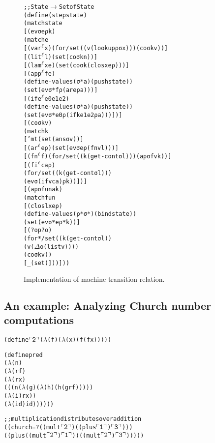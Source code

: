 \documentclass[preprint]{sigplanconf}
\begin{document}
\begin{figure}
\begin{alltt}
  ;; State \(\rightarrow\) Setof State
  (define (step state)
    (match state
      [(ev σ e ρ k)
       (match e
         [(var\(\superscript\ell\) x)           (for/set ((v (lookup ρ σ x))) (co σ k v))]
         [(lit\(\superscript\ell\) l)           (set (co σ k n))]
         [(lam\(\superscript\ell\) x e)         (set (co σ k (clos x e ρ)))]
         [(app\(\superscript\ell\) f e)
          (define-values (σ* a) (push state))
          (set (ev σ* f ρ (ar e ρ a)))]
         [(ife\(\superscript\ell\) e0 e1 e2)
          (define-values (σ* a) (push state))
          (set (ev σ* e0 ρ (ifk e1 e2 ρ a)))])]
      [(co σ k v)
       (match k
         ['mt (set (ans σ v))]
         [(ar\(\superscript\ell\) e ρ) (set (ev σ e ρ (fn v l)))]
         [(fn\(\superscript\ell\) f)   (for/set ((k (get-cont σ l))) (ap σ f v k))]
         [(fi\(\superscript\ell\) c a ρ)
          (for/set ((k (get-cont σ l)))
            (ev σ (if v c a) ρ k))])]
      [(ap σ fun a k)
       (match fun
         [(clos l x e ρ)
          (define-values (ρ* σ*) (bind state))
          (set (ev σ* e ρ* k))]
         [(? op? o)
          (for*/set ((k (get-cont σ l))
                     (v (\(\Delta\) o (list v))))
            (co σ k v))
         [_ (set)]))]))
\end{alltt}
\caption{Implementation of machine transition relation.}
\end{figure}

\subsection{An example: Analyzing Church number computations}

\newcommand{\church}[1]{\(\ulcorner{\tt #1}\urcorner\)}

\begin{alltt}
(define \church2 (\(\lambda\) (f) (\(\lambda\) (x) (f (f x)))))

(define pred
  (\(\lambda\) (n)
    (\(\lambda\) (rf)
      (\(\lambda\) (rx)
        (((n (\(\lambda\) (g) (\(\lambda\) (h) (h (g rf)))))
          (\(\lambda\) (i) rx))
         (\(\lambda\) (id) id))))))
\end{alltt}

\begin{alltt}
;; multiplication distributes over addition
((church=? ((mult \church2) ((plus \church1) \church3)))
 ((plus ((mult \church2) \church1)) ((mult \church2) \church3)))))
\end{alltt}
\end{document}
